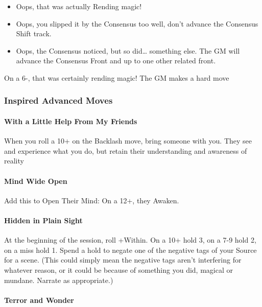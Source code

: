 \documentclass[
  oneside,
  statementpaper,
  9pt]{memoir}
\begin{document}
\begin{itemize}
\item
  Oops, that was actually Rending magic!
\item
  Oops, you slipped it by the Consensus too well, don't advance the
  Consensus Shift track.
\item
  Oops, the Consensus noticed, but so did\ldots{} something else. The GM
  will advance the Consensus Front and up to one other related front.
\end{itemize}

On a 6-, that was certainly rending magic! The GM makes a hard move

\hypertarget{inspired-advanced-moves}{%
\subsubsection{Inspired Advanced Moves}\label{inspired-advanced-moves}}

\hypertarget{with-a-little-help-from-my-friends}{%
\paragraph{With a Little Help From My
Friends}\label{with-a-little-help-from-my-friends}}

When you roll a 10+ on the Backlash move, bring someone with you. They
see and experience what you do, but retain their understanding and
awareness of reality

\hypertarget{mind-wide-open}{%
\paragraph{Mind Wide Open}\label{mind-wide-open}}

Add this to Open Their Mind: On a 12+, they Awaken.

\hypertarget{hidden-in-plain-sight}{%
\paragraph{Hidden in Plain Sight}\label{hidden-in-plain-sight}}

At the beginning of the session, roll +Within. On a 10+ hold 3, on a 7-9
hold 2, on a miss hold 1. Spend a hold to negate one of the negative
tags of your Source for a scene. (This could simply mean the negative
tags aren't interfering for whatever reason, or it could be because of
something you did, magical or mundane. Narrate as appropriate.)

\hypertarget{terror-and-wonder}{%
\paragraph{Terror and Wonder}\label{terror-and-wonder}}
\end{document}

